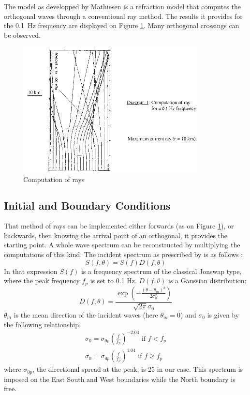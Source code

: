 The model as developped by Mathiesen is a refraction model that computes the
orthogonal waves through a conventional ray method. The results it provides for
the 0.1\ Hz frequency are displayed on Figure \ref{ray}. Many orthogonal
crossings can be observed.
\begin{figure} [!h]
\centering
\includegraphics[width=0.85\textwidth]{diagram.png}
 \caption{Computation of rays}
\label{ray}
\end{figure}

\subsection{Initial and Boundary Conditions}

That method of rays can be implemented  either forwards (as on Figure
\ref{ray}), or backwards, then knowing the arrival point of an orthogonal, it
provides the starting point. A whole wave spectrum can be reconstructed by
multiplying the computations of this kind. The incident spectrum as prescribed
by \cite{Mathiesen1987} is as follows :
$$
S(f,\theta)=S(f)D(f,\theta)
$$
In that expression $S(f)$ is a frequency spectrum of the classical Jonswap type, where the peak frequency $f_p$ is set to 0.1 Hz.
$D(f,\theta)$ is a Gaussian distribution:
$$
D(f,\theta)=\frac{\exp\left(-\frac{(\theta-\theta_m)^2}{2\sigma_0^2} \right)}{\sqrt{2\pi}\sigma_0}
$$
$\theta_m$ is the mean direction of the incident waves (here $\theta_m=0$) and
$\sigma_0$ is given by the following relationship.
$$
\left.
\begin{array}{ll}
\sigma_0= \sigma_{0p}\left(\frac{f}{f_p}\right)^{-2.03}\mbox{ if }f<f_p \\[6pt]
\sigma_0= \sigma_{0p}\left(\frac{f}{f_p}\right)^{1.04}\mbox{ if } f \ge f_p
\end{array}
\right.
$$
where $\sigma_{0p}$, the directional spread at the peak, is 25 in our case.
This spectrum is imposed on the East South and West boundaries while the North boundary is free.

